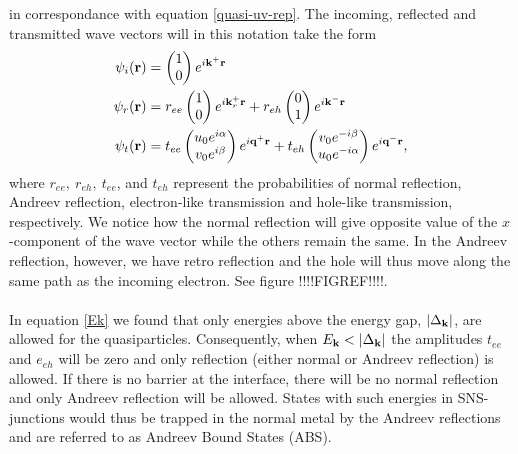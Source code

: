 in correspondance with equation \eqref{quasi-uv-rep}.
The incoming, reflected and transmitted wave vectors will in this notation take the form
\begin{equation}
\begin{split}
    \psi_i(\mathbf{r})&=\begin{pmatrix}1 \\ 0\end{pmatrix}e^{i\mathbf{k}^+\mathbf{r}}\\
    \psi_r(\mathbf{r})&=r_{ee}\begin{pmatrix}1 \\ 0\end{pmatrix}e^{i\mathbf{k}_r^+\mathbf{r}}
    + r_{eh}\begin{pmatrix}0 \\ 1\end{pmatrix}e^{i\mathbf{k}^-\mathbf{r}}\\
    \psi_t(\mathbf{r})&=t_{ee}\begin{pmatrix}u_0e^{i\alpha}\\ v_0e^{i\beta} \end{pmatrix}e^{i\mathbf{q}^+\mathbf{r}} + t_{eh} \begin{pmatrix}v_0e^{-i\beta}\\u_0e^{-i\alpha}\end{pmatrix}e^{i\mathbf{q}^-\mathbf{r}},
\end{split}
\label{AndreevWaveFunctions}
\end{equation}
where $r_{ee}, \ r_{eh}, \ t_{ee}$, and $t_{eh}$ represent the probabilities of normal reflection, Andreev reflection, electron-like transmission and hole-like transmission, respectively. We notice how the normal reflection will give opposite value of the $x$-component of the wave vector while the others remain the same. In the Andreev reflection, however, we have retro reflection and the hole will thus move along the same path as the incoming electron. See figure !!!!FIGREF!!!!.
\\
\\
In equation \eqref{Ek} we found that only energies above the energy gap, $\left|\Delta_{\mathbf{k}}\right|$, are allowed for the quasiparticles. Consequently, when $E_{\mathbf{k}}<\left|\Delta_{\mathbf{k}}\right|$ the amplitudes $t_{ee}$ and $e_{eh}$ will be zero and only reflection (either normal or Andreev reflection) is allowed. If there is no barrier at the interface, there will be no normal reflection and only Andreev reflection will be allowed. States with such energies in SNS-junctions would thus be trapped in the normal metal by the Andreev reflections and are referred to as Andreev Bound States (ABS).

